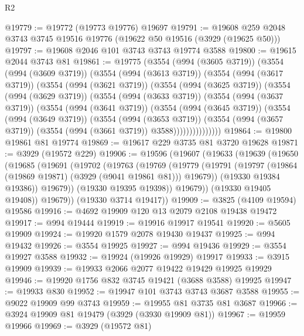 \begin{lexlean}{R2}
\begin{coremodule}
@19779 := @19772 (@19773 @19776) @19697
@19791 := @19608 @259 @2048 @3743 @3745 @19516 @19776 (@19622 @50 @19516 (@3929 (@19625 @50)))
@19797 := @19608 @2046 @101 @3743 @3743 @19774 @3588
@19800 := @19615 @2044 @3743 @81
@19861 := @19775
    (@3554
      (@994 (@3605 @3719))
      (@3554
        (@994 (@3609 @3719))
        (@3554
          (@994 (@3613 @3719))
          (@3554
            (@994 (@3617 @3719))
            (@3554
              (@994 (@3621 @3719))
              (@3554
                (@994 (@3625 @3719))
                (@3554
                  (@994 (@3629 @3719))
                  (@3554
                    (@994 (@3633 @3719))
                    (@3554
                      (@994 (@3637 @3719))
                      (@3554
                        (@994 (@3641 @3719))
                        (@3554
                          (@994 (@3645 @3719))
                          (@3554
                            (@994 (@3649 @3719))
                            (@3554
                              (@994 (@3653 @3719))
                              (@3554
                                (@994 (@3657 @3719))
                                (@3554 (@994 (@3661 @3719)) @3588)))))))))))))))
@19864 := @19800 @19861 @81 @19774
@19869 := @19617 @229 @3735 @81 @3720 @19628
@19871 := @3929 (@19572 @229)
@19906 := @19596
    (@19607
      (@19633
        (@19639
          (@19650
            (@19685
              (@19691
                (@19702
                  (@19763
                    (@19769
                      (@19779
                        (@19791 (@19797 (@19864 (@19869 @19871) (@3929 (@9041 @19861 @81))) @19679))
                        (@19330 @19384 @19386))
                      @19679))
                  (@19330 @19395 @19398))
                @19679))
            (@19330 @19405 @19408))
          @19679))
      (@19330 @3714 @19417))
@19909 := @3825 (@4109 @19594) @19586
@19916 := @4692 @19909 @120 @13 @2079 @2108 @19438 @19472
@19917 := @994 @19444
@19919 := @19916 @19917 @19541
@19920 := @5605 @19909
@19924 := @19920 @1579 @2078 @19430 @19437
@19925 := @994 @19432
@19926 := @3554 @19925
@19927 := @994 @19436
@19929 := @3554 @19927 @3588
@19932 := @19924 (@19926 @19929) @19917
@19933 := @3915 @19909
@19939 := @19933 @2066 @2077 @19422 @19429 @19925 @19929
@19946 := @19920 @1756 @832 @3745 @19421 (@3688 @3588) @19925
@19947 := @19933 @830
@19952 := @19947 @101 @3743 @3743 @3687 @3588
@19955 := @9022 @19909 @99 @3743
@19959 := @19955 @81 @3735 @81 @3687
@19966 := @3924 @19909 @81 @19479 (@3929 (@3930 @19909 @81))
@19967 := @19959 @19966
@19969 := @3929 (@19572 @81)

\end{coremodule}
\end{lexlean}

